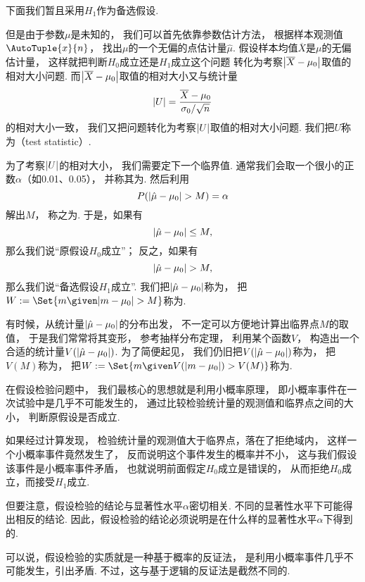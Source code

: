 下面我们暂且采用\(H_1\)作为备选假设.

但是由于参数\(\mu\)是未知的，
我们可以首先依靠参数估计方法，
根据样本观测值\(\AutoTuple{x}{n}\)，
找出\(\mu\)的一个无偏的点估计量\(\hat{\mu}\).
假设样本均值\(\overline{X}\)是\(\mu\)的无偏估计量，
这样就把判断\(H_0\)成立还是\(H_1\)成立这个问题
转化为考察\(\abs{\overline{X}-\mu_0}\)取值的相对大小问题.
而\(\abs{\overline{X}-\mu_0}\)取值的相对大小又与统计量\[
	\abs{U} = \frac{\overline{X}-\mu_0}{\sigma_0/\sqrt{n}}
\]的相对大小一致，
我们又把问题转化为考察\(\abs{U}\)取值的相对大小问题.
我们把\(U\)称为（test statistic）.

为了考察\(\abs{U}\)的相对大小，
我们需要定下一个临界值.
通常我们会取一个很小的正数\(\alpha\)（如0.01、0.05），
并称其为.
然后利用\[
	P(\abs{\hat{\mu} - \mu_0} > M) = \alpha
\]解出\(M\)，
称之为.
于是，如果有\[
	\abs{\hat{\mu} - \mu_0} \leq M,
\]
那么我们说“原假设\(H_0\)成立”；
反之，如果有\[
	\abs{\hat{\mu} - \mu_0} > M,
\]
那么我们说“备选假设\(H_1\)成立”.
我们把\(\abs{\hat{\mu} - \mu_0}\)称为，
把\(W \defeq \Set{ m \given \abs{m - \mu_0} > M }\)称为.

有时候，从统计量\(\abs{\hat{\mu} - \mu_0}\)的分布出发，
不一定可以方便地计算出临界点\(M\)的取值，
于是我们常常将其变形，
参考抽样分布定理，
利用某个函数\(V\)，
构造出一个合适的统计量\(V(\abs{\hat{\mu} - \mu_0})\).
为了简便起见，
我们仍旧把\(V(\abs{\hat{\mu} - \mu_0})\)称为，
把\(V(M)\)称为，
把\(W \defeq \Set{ m \given V(\abs{m - \mu_0}) > V(M) }\)称为.

在假设检验问题中，
我们最核心的思想就是利用小概率原理，
即小概率事件在一次试验中是几乎不可能发生的，
通过比较检验统计量的观测值和临界点之间的大小，
判断原假设是否成立.

如果经过计算发现，
检验统计量的观测值大于临界点，落在了拒绝域内，
这样一个小概率事件竟然发生了，
反而说明这个事件发生的概率并不小，
这与我们假设该事件是小概率事件矛盾，
也就说明前面假定\(H_0\)成立是错误的，
从而拒绝\(H_0\)成立，而接受\(H_1\)成立.

但要注意，假设检验的结论与显著性水平\(\alpha\)密切相关.
不同的显著性水平下可能得出相反的结论.
因此，假设检验的结论必须说明是在什么样的显著性水平\(\alpha\)下得到的.

可以说，假设检验的实质就是一种基于概率的反证法，
是利用小概率事件几乎不可能发生，引出矛盾.
不过，这与基于逻辑的反证法是截然不同的.

